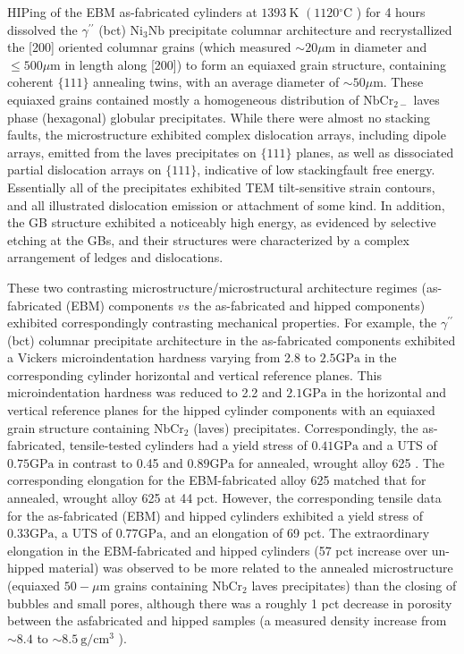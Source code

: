\documentclass[10pt]{article}
\begin{document}
HIPing of the EBM as-fabricated cylinders at $1393 \mathrm{~K}$ $\left(1120{ }^{\circ} \mathrm{C}\right.$ ) for 4 hours dissolved the $\gamma^{\prime \prime}$ (bct) $\mathrm{Ni}_{3} \mathrm{Nb}$ precipitate columnar architecture and recrystallized the [200] oriented columnar grains (which measured $\sim 20 \mu \mathrm{m}$ in diameter and $\leq 500 \mu \mathrm{m}$ in length along [200]) to form an equiaxed grain structure, containing coherent $\{111\}$ annealing twins, with an average diameter of $\sim 50 \mu \mathrm{m}$. These equiaxed grains contained mostly a homogeneous distribution of $\mathrm{NbCr}_{2-}$ laves phase (hexagonal) globular precipitates. While there were almost no stacking faults, the microstructure exhibited complex dislocation arrays, including dipole arrays, emitted from the laves precipitates on $\{111\}$ planes, as well as dissociated partial dislocation arrays on $\{111\}$, indicative of low stackingfault free energy. Essentially all of the precipitates exhibited TEM tilt-sensitive strain contours, and all illustrated dislocation emission or attachment of some kind. In addition, the GB structure exhibited a noticeably high energy, as evidenced by selective etching at the GBs, and their structures were characterized by a complex arrangement of ledges and dislocations.

These two contrasting microstructure/microstructural architecture regimes (as-fabricated (EBM) components $v s$ the as-fabricated and hipped components) exhibited correspondingly contrasting mechanical properties. For example, the $\gamma^{\prime \prime}$ (bct) columnar precipitate architecture in the as-fabricated components exhibited a Vickers microindentation hardness varying from 2.8 to $2.5 \mathrm{GPa}$ in the corresponding cylinder horizontal and vertical reference planes. This microindentation hardness was reduced to 2.2 and $2.1 \mathrm{GPa}$ in the horizontal and vertical reference planes for the hipped cylinder components with an equiaxed grain structure containing $\mathrm{NbCr}_{2}$ (laves) precipitates. Correspondingly, the as-fabricated, tensile-tested cylinders had a yield stress of $0.41 \mathrm{GPa}$ and a UTS of $0.75 \mathrm{GPa}$ in contrast to 0.45 and $0.89 \mathrm{GPa}$ for annealed, wrought alloy 625 . The corresponding elongation for the EBM-fabricated alloy 625 matched that for annealed, wrought alloy 625 at 44 pct. However, the corresponding tensile data for the as-fabricated (EBM) and hipped cylinders exhibited a yield stress of $0.33 \mathrm{GPa}$, a UTS of $0.77 \mathrm{GPa}$, and an elongation of 69 pct. The extraordinary elongation in the EBM-fabricated and hipped cylinders (57 pct increase over un-hipped material) was observed to be more related to the annealed microstructure (equiaxed $50-\mu \mathrm{m}$ grains containing $\mathrm{NbCr}_{2}$ laves precipitates) than the closing of bubbles and small pores, although there was a roughly 1 pct decrease in porosity between the asfabricated and hipped samples (a measured density increase from $\sim 8.4$ to $\sim 8.5 \mathrm{~g} / \mathrm{cm}^{3}$ ).
\end{document}
